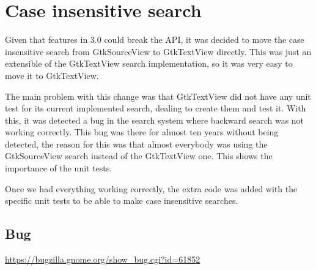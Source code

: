 \section{Case insensitive search}

Given that features in 3.0 could break the API, it was decided to move the case insensitive search from GtkSourceView 
to GtkTextView directly. This was just an extensible of the GtkTextView search implementation, so it was very easy to move it to GtkTextView.

The main problem with this change  was that GtkTextView did not have any unit test for its current implemented search, 
dealing to create them and test it.   With this, it was detected a bug in the search system where backward search was 
not working correctly. This bug was there for almost ten years without being detected, the reason for this was that 
almost everybody was using the GtkSourceView search instead of the GtkTextView one. This shows the importance of the unit tests.

Once we had everything working correctly, the extra code was added with the specific unit tests to be able to make 
case insensitive searches.

\subsection{Bug}

\noindent\url{https://bugzilla.gnome.org/show_bug.cgi?id=61852}
